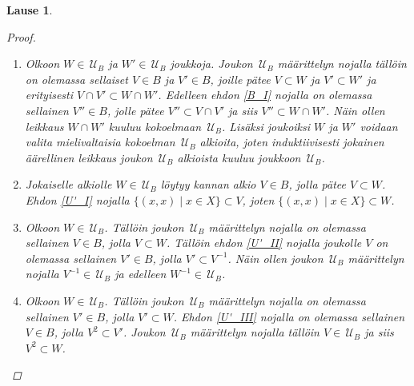 \documentclass[12pt,a4paper,leqno]{report}
\newcommand{\U}{\,\mathcal{U}}
\theoremstyle{plain}
\newtheorem{lause}[equation]{Lause}
\theoremstyle{definition}
\theoremstyle{remark}
\begin{document}
\begin{lause}
\begin{proof}
\begin{enumerate}
Toisaalta jos osajoukolle $W'\subset X\times X$ pätee $V\subset W \subset W'$, 
niin $W'\in\U_B$. \\
Siis jos $W\in \U_B$ ja $W\subset W'\subset X\times X$, niin $ W'\in\U_B$.
\item[\ref{F_II}] Olkoon $W\in\U_B$ ja $W'\in\U_B$ joukkoja. 
Joukon $\U_B$ määrittelyn nojalla tällöin on olemassa 
sellaiset $V\in B$ ja $V'\in B$, 
joille pätee $V\subset W$ ja $V'\subset W'$ ja 
erityisesti $V\cap V'\subset W\cap W'$. 
Edelleen ehdon \ref{B_I} nojalla on olemassa sellainen $V''\in B$, 
jolle pätee $V''\subset V\cap V'$ ja siis $V''\subset W\cap W'$. 
Näin ollen leikkaus $W\cap W'$ kuuluu kokoelmaan $\U_B$. 
Lisäksi joukoiksi $W$ ja $W'$ voidaan valita mielivaltaisia kokoelman $\U_B$ alkioita, 
joten induktiivisesti jokainen äärellinen leikkaus joukon $\U_B$ alkioista kuuluu joukkoon $\U_B$.
\item[\ref{U_I}] 
Jokaiselle alkiolle $W\in\U_B$ löytyy 
kannan alkio $V\in B$, jolla pätee $V\subset W$. 
Ehdon \ref{U'_I} nojalla $\{(x,x)\mid x\in X\}\subset V$, 
joten $\{(x,x)\mid x\in X\}\subset W$.
\item[\ref{U_II}] Olkoon $W\in\U_B$. 
Tällöin joukon $\U_B$ määrittelyn nojalla on olemassa sellainen $V\in B$, 
jolla $V\subset W$. %
Tällöin ehdon \ref{U'_II} nojalla joukolle $V$ on olemassa sellainen $V'\in B$, 
jolla $V'\subset V^{-1}$. 
Näin ollen joukon $\U_B$ määrittelyn nojalla $V^{-1}\in\U_B$ ja 
edelleen $W^{-1}\in\U_B$. 
\item[\ref{U_III}] Olkoon $W\in\U_B$. 
Tällöin joukon $\U_B$ määrittelyn nojalla on olemassa sellainen $V'\in B$, 
jolla $V'\subset W$. 
Ehdon \ref{U'_III} nojalla on olemassa sellainen $V\in B$, jolla $ V^2\subset V'$. 
Joukon $\U_B$ määrittelyn nojalla tällöin $V\in \U_B$ ja siis $ V^2\subset W$.
\end{enumerate}
\end{proof}
\end{lause}
\end{document}
